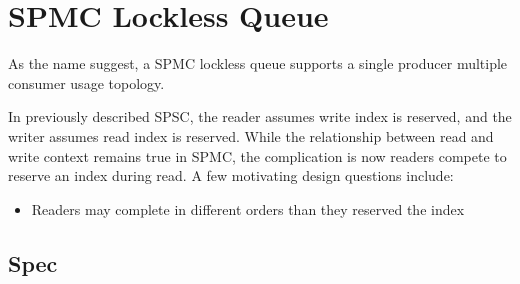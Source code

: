 % 

\chapter{SPMC Lockless Queue}

As the name suggest, a SPMC lockless queue supports a single producer multiple
consumer usage topology.\newline

In previously described SPSC, the reader assumes write index is reserved, and
the writer assumes read index is reserved. While the relationship between read
and write context remains true in SPMC, the complication is now readers compete
to reserve an index during read. A few motivating design questions include:
\begin{itemize}
    \item Readers may complete in different orders than they reserved the index 
\end{itemize}

\section{Spec}

